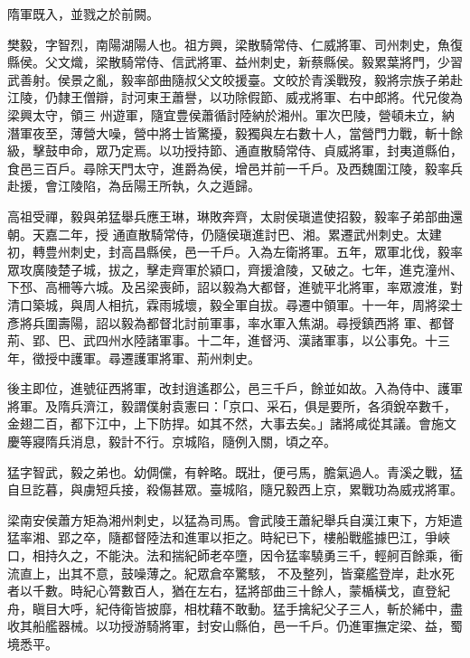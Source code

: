 \begin{pinyinscope}
 隋軍既入，並戮之於前闕。



 樊毅，字智烈，南陽湖陽人也。祖方興，梁散騎常侍、仁威將軍、司州刺史，魚復縣侯。父文熾，梁散騎常侍、信武將軍、益州刺史，新蔡縣侯。毅累葉將門，少習武善射。侯景之亂，毅率部曲隨叔父文皎援臺。文皎於青溪戰歿，毅將宗族子弟赴江陵，仍隸王僧辯，討河東王蕭譽，以功除假節、威戎將軍、右中郎將。代兄俊為梁興太守，領三
 州遊軍，隨宜豊侯蕭循討陸納於湘州。軍次巴陵，營頓未立，納潛軍夜至，薄營大噪，營中將士皆驚擾，毅獨與左右數十人，當營門力戰，斬十餘級，擊鼓申命，眾乃定焉。以功授持節、通直散騎常侍、貞威將軍，封夷道縣伯，食邑三百戶。尋除天門太守，進爵為侯，增邑并前一千戶。及西魏圍江陵，毅率兵赴援，會江陵陷，為岳陽王所執，久之遁歸。



 高祖受禪，毅與弟猛舉兵應王琳，琳敗奔齊，太尉侯瑱遣使招毅，毅率子弟部曲還朝。天嘉二年，授
 通直散騎常侍，仍隨侯瑱進討巴、湘。累遷武州刺史。太建初，轉豊州刺史，封高昌縣侯，邑一千戶。入為左衛將軍。五年，眾軍北伐，毅率眾攻廣陵楚子城，拔之，擊走齊軍於潁口，齊援滄陵，又破之。七年，進克潼州、下邳、高柵等六城。及呂梁喪師，詔以毅為大都督，進號平北將軍，率眾渡淮，對清口築城，與周人相抗，霖雨城壞，毅全軍自拔。尋遷中領軍。十一年，周將梁士彥將兵圍壽陽，詔以毅為都督北討前軍事，率水軍入焦湖。尋授鎮西將
 軍、都督荊、郢、巴、武四州水陸諸軍事。十二年，進督沔、漢諸軍事，以公事免。十三年，徵授中護軍。尋遷護軍將軍、荊州刺史。



 後主即位，進號征西將軍，改封逍遙郡公，邑三千戶，餘並如故。入為侍中、護軍將軍。及隋兵濟江，毅謂僕射袁憲曰：「京口、采石，俱是要所，各須銳卒數千，金翅二百，都下江中，上下防捍。如其不然，大事去矣。」諸將咸從其議。會施文慶等寢隋兵消息，毅計不行。京城陷，隨例入關，頃之卒。



 猛字智武，毅之弟也。幼倜儻，有幹略。既壯，便弓馬，膽氣過人。青溪之戰，猛自旦訖暮，與虜短兵接，殺傷甚眾。臺城陷，隨兄毅西上京，累戰功為威戎將軍。



 梁南安侯蕭方矩為湘州刺史，以猛為司馬。會武陵王蕭紀舉兵自漢江東下，方矩遣猛率湘、郢之卒，隨都督陸法和進軍以拒之。時紀已下，樓船戰艦據巴江，爭峽口，相持久之，不能決。法和揣紀師老卒墮，因令猛率驍勇三千，輕舸百餘乘，衝流直上，出其不意，鼓噪薄之。紀眾倉卒驚駭，
 不及整列，皆棄艦登岸，赴水死者以千數。時紀心膂數百人，猶在左右，猛將部曲三十餘人，蒙楯橫戈，直登紀舟，瞋目大呼，紀侍衛皆披靡，相枕藉不敢動。猛手擒紀父子三人，斬於絺中，盡收其船艦器械。以功授游騎將軍，封安山縣伯，邑一千戶。仍進軍撫定梁、益，蜀境悉平。




\end{pinyinscope}
